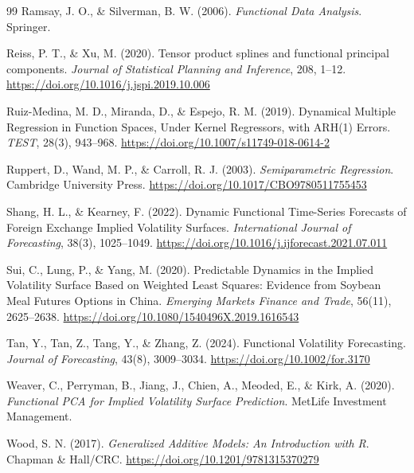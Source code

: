\documentclass[a4paper,11pt]{article}
\begin{document}
\begin{thebibliography}{99}
Ramsay, J. O., \& Silverman, B. W. (2006). \emph{Functional Data Analysis}. Springer.

Reiss, P. T., \& Xu, M. (2020). Tensor product splines and functional principal components. \emph{Journal of Statistical Planning and Inference}, 208, 1--12. \url{https://doi.org/10.1016/j.jspi.2019.10.006}

Ruiz-Medina, M. D., Miranda, D., \& Espejo, R. M. (2019). Dynamical Multiple Regression in Function Spaces, Under Kernel Regressors, with ARH(1) Errors. \emph{TEST}, 28(3), 943--968. \url{https://doi.org/10.1007/s11749-018-0614-2}

Ruppert, D., Wand, M. P., \& Carroll, R. J. (2003). \emph{Semiparametric Regression}. Cambridge University Press. \url{https://doi.org/10.1017/CBO9780511755453}

Shang, H. L., \& Kearney, F. (2022). Dynamic Functional Time-Series Forecasts of Foreign Exchange Implied Volatility Surfaces. \emph{International Journal of Forecasting}, 38(3), 1025--1049. \url{https://doi.org/10.1016/j.ijforecast.2021.07.011}

Sui, C., Lung, P., \& Yang, M. (2020). Predictable Dynamics in the Implied Volatility Surface Based on Weighted Least Squares: Evidence from Soybean Meal Futures Options in China. \emph{Emerging Markets Finance and Trade}, 56(11), 2625--2638. \url{https://doi.org/10.1080/1540496X.2019.1616543}

Tan, Y., Tan, Z., Tang, Y., \& Zhang, Z. (2024). Functional Volatility Forecasting. \emph{Journal of Forecasting}, 43(8), 3009--3034. \url{https://doi.org/10.1002/for.3170}

Weaver, C., Perryman, B., Jiang, J., Chien, A., Meoded, E., \& Kirk, A. (2020). \emph{Functional PCA for Implied Volatility Surface Prediction}. MetLife Investment Management.

Wood, S. N. (2017). \emph{Generalized Additive Models: An Introduction with R}. Chapman \& Hall/CRC. \url{https://doi.org/10.1201/9781315370279}

\end{thebibliography}
\end{document}
